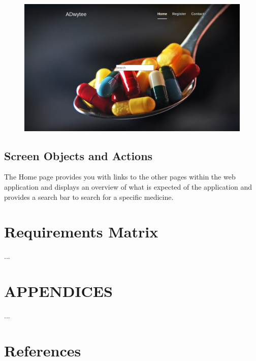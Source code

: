 \documentclass[]{article}
\begin{document}
\begin{figure}[H]
\centering
\includegraphics[scale=0.18]{./Home}
\end{figure}


\subsection {Screen Objects and Actions}
The Home page provides you with links to the other pages within the web application and displays an overview of what is expected of the application and provides a search bar to search for a specific medicine.


\section{Requirements Matrix}
...


\section{APPENDICES}
...

\section {References}



\end{document}
